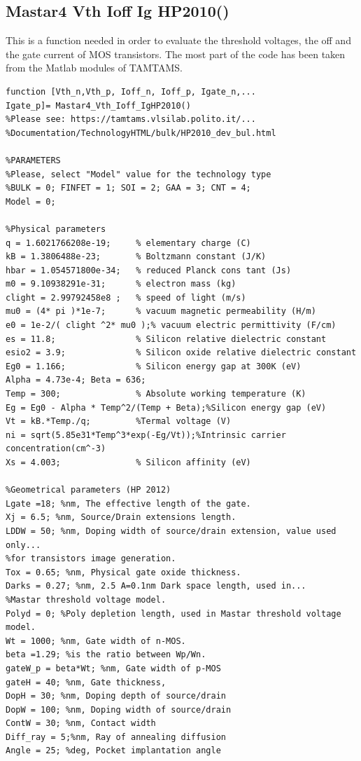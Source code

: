 \subsection{Mastar4 Vth Ioff Ig HP2010()}
This is a function needed in order to evaluate the threshold voltages, the off and the gate current of MOS transistors.
The most part of the code has been taken from the Matlab modules of TAMTAMS.

\begin{lstlisting}
function [Vth_n,Vth_p, Ioff_n, Ioff_p, Igate_n,...
Igate_p]= Mastar4_Vth_Ioff_IgHP2010()
%Please see: https://tamtams.vlsilab.polito.it/...
%Documentation/TechnologyHTML/bulk/HP2010_dev_bul.html

%PARAMETERS           
%Please, select "Model" value for the technology type
%BULK = 0; FINFET = 1; SOI = 2; GAA = 3; CNT = 4;
Model = 0; 

%Physical parameters
q = 1.6021766208e-19;     % elementary charge (C)
kB = 1.3806488e-23;       % Boltzmann constant (J/K)
hbar = 1.054571800e-34;   % reduced Planck cons tant (Js)
m0 = 9.10938291e-31;      % electron mass (kg)
clight = 2.99792458e8 ;   % speed of light (m/s)
mu0 = (4* pi )*1e-7;      % vacuum magnetic permeability (H/m)
e0 = 1e-2/( clight ^2* mu0 );% vacuum electric permittivity (F/cm)
es = 11.8;                % Silicon relative dielectric constant
esio2 = 3.9;              % Silicon oxide relative dielectric constant
Eg0 = 1.166;              % Silicon energy gap at 300K (eV)
Alpha = 4.73e-4; Beta = 636;
Temp = 300;               % Absolute working temperature (K)
Eg = Eg0 - Alpha * Temp^2/(Temp + Beta);%Silicon energy gap (eV)
Vt = kB.*Temp./q;         %Termal voltage (V)
ni = sqrt(5.85e31*Temp^3*exp(-Eg/Vt));%Intrinsic carrier concentration(cm^-3)
Xs = 4.003;               % Silicon affinity (eV)

%Geometrical parameters (HP 2012)
Lgate =18; %nm, The effective length of the gate.
Xj = 6.5; %nm, Source/Drain extensions length.
LDDW = 50; %nm, Doping width of source/drain extension, value used only...
%for transistors image generation.
Tox = 0.65; %nm, Physical gate oxide thickness.
Darks = 0.27; %nm, 2.5 A=0.1nm Dark space length, used in...
%Mastar threshold voltage model.
Polyd = 0; %Poly depletion length, used in Mastar threshold voltage model.
Wt = 1000; %nm, Gate width of n-MOS.
beta =1.29; %is the ratio between Wp/Wn.
gateW_p = beta*Wt; %nm, Gate width of p-MOS
gateH = 40; %nm, Gate thickness, 
DopH = 30; %nm, Doping depth of source/drain
DopW = 100; %nm, Doping width of source/drain
ContW = 30; %nm, Contact width
Diff_ray = 5;%nm, Ray of annealing diffusion
Angle = 25; %deg, Pocket implantation angle


\end{lstlisting}
